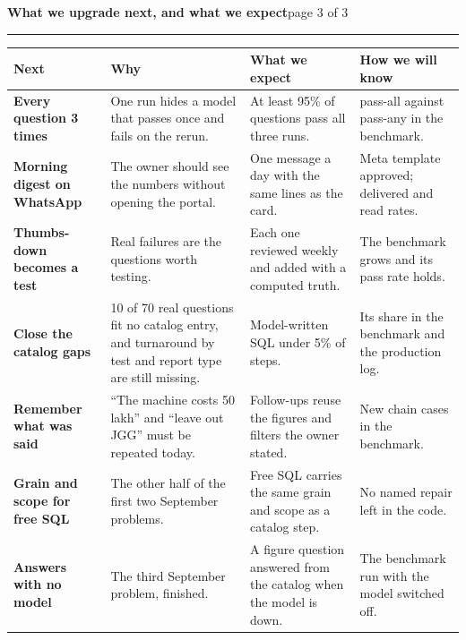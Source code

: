 \documentclass[10pt,a4paper]{article}
\begin{document}
\clearpage

{\color{navy}\Large\bfseries What we upgrade next, and what we expect}\hfill{\color{slate}\small page 3 of 3}\\[2pt]
{\color{mist}\hrule height 1.2pt}

\vspace{6pt}
{\footnotesize
\begin{tabular}{@{}L{3.3cm}L{5.0cm}L{4.6cm}L{4.0cm}@{}}
\toprule
\textbf{Next} & \textbf{Why} & \textbf{What we expect} & \textbf{How we will know}\\
\midrule
\textbf{Every question 3 times} & One run hides a model that passes once and fails on the rerun. &
 At least 95\% of questions pass all three runs. & pass-all against pass-any in the benchmark.\\
\textbf{Morning digest on WhatsApp} & The owner should see the numbers without opening the portal. &
 One message a day with the same lines as the card. & Meta template approved; delivered and read rates.\\
\textbf{Thumbs-down becomes a test} & Real failures are the questions worth testing. &
 Each one reviewed weekly and added with a computed truth. & The benchmark grows and its pass rate holds.\\
\textbf{Close the catalog gaps} & 10 of 70 real questions fit no catalog entry, and turnaround by test and report type are still missing. &
 Model-written SQL under 5\% of steps. & Its share in the benchmark and the production log.\\
\textbf{Remember what was said} & ``The machine costs 50 lakh'' and ``leave out JGG'' must be repeated today. &
 Follow-ups reuse the figures and filters the owner stated. & New chain cases in the benchmark.\\
\textbf{Grain and scope for free SQL} & The other half of the first two September problems. &
 Free SQL carries the same grain and scope as a catalog step. & No named repair left in the code.\\
\textbf{Answers with no model} & The third September problem, finished. & A figure question answered from the catalog when the model is down. &
 The benchmark run with the model switched off.\\
\bottomrule
\end{tabular}}
\end{document}
